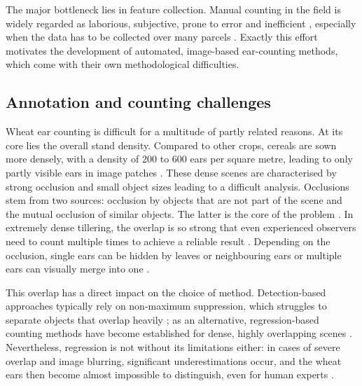 \documentclass[12pt,parskip = half, DIV=classic,listof=totoc]{scrartcl}
\begin{document}
			The major bottleneck lies in feature collection. Manual counting in the field is widely regarded as laborious, subjective, 
			prone to error and inefficient \cite{madecEarDensityEstimation2019,luCaoTasselNetV2F2020}, especially when the data has to be collected 
			over many parcels \cite{guoAerialImageryAnalysis2018}. Exactly this effort motivates the development of automated, image-based 
			ear-counting methods, which come with their own methodological difficulties.

		\subsection{Annotation and counting challenges}
			Wheat ear counting is difficult for a multitude of partly related reasons. At its core lies the overall stand density. 
			Compared to other crops, cereals are sown more densely, with a density of 200 to 600 ears per square metre, leading to only partly visible ears in image patches \cite{xiongTasselNetv2InfieldCounting2019}.
			These dense scenes are characterised by strong occlusion and small object sizes leading to a difficult analysis. Occlusions stem from two sources: 
			occlusion by objects that are not part of the scene and the mutual occlusion of similar objects. The latter is the core of the problem \cite{zhangApplicationsDeepLearning2020}. 
			In extremely dense tillering, the overlap is so strong that even experienced observers need to count multiple times to achieve a reliable result \cite{xiongTasselNetv2InfieldCounting2019}. 
			Depending on the occlusion, single ears can be hidden by leaves or neighbouring ears or multiple ears can visually merge into one \cite{guoAerialImageryAnalysis2018}.

			This overlap has a direct impact on the choice of method. Detection-based approaches typically rely on 
 			non-maximum suppression, which struggles to separate objects that overlap heavily \cite{xiongTasselNetv2InfieldCounting2019}; as an alternative, regression-based counting 
			methods have become established for dense, highly overlapping scenes \cite{madecEarDensityEstimation2019}. Nevertheless, regression is not without its limitations either: 
			in cases of severe overlap and image blurring, significant underestimations occur, and the wheat ears then become almost impossible to distinguish, even for human experts 
 			\cite{xiongTasselNetv2InfieldCounting2019}.\\
\end{document}
